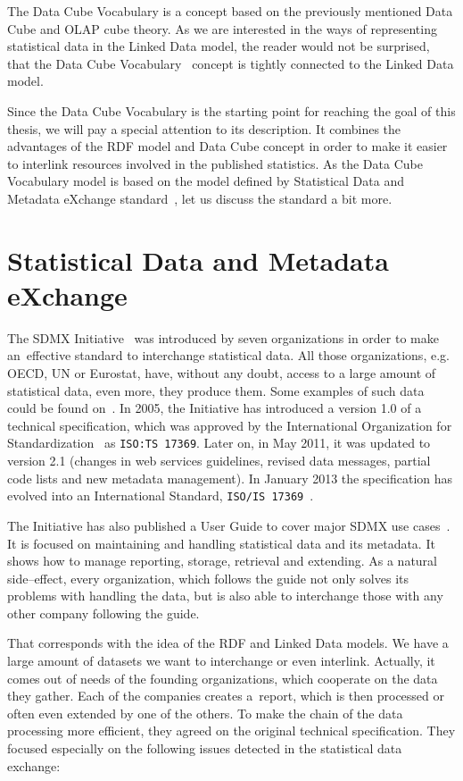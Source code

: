 The Data Cube Vocabulary is a concept based on the previously mentioned Data Cube and
OLAP cube theory. As we are interested in the ways of representing statistical data in the
Linked Data model, the reader would not be surprised, that the Data Cube 
Vocabulary~\cite{dcv}
concept is tightly connected to the Linked Data model.

Since the Data Cube Vocabulary is the starting point for reaching the goal of this thesis,
we will pay a special attention to its description. It combines the advantages of the RDF
model and Data Cube concept in order to make it easier to interlink resources involved
in the published statistics. As the Data Cube Vocabulary model is based on the model defined
by Statistical Data and Metadata eXchange standard~\cite{sdmx}, let us discuss the standard a bit more.

\section{Statistical Data and Metadata eXchange}
The SDMX Initiative~\cite{sdmx} was introduced by seven organizations in order to make
an~effective standard to interchange statistical data. All those organizations, e.g. OECD,
UN or Eurostat, have, without any doubt, access to a large amount of statistical data, even more,
they produce them. Some examples of such data could be found on~\cite{pubdata}.
In 2005, the Initiative has introduced a
version 1.0 of a technical specification, which was approved by the International
Organization for Standardization~\cite{iso} as \texttt{ISO:TS 17369}.
Later on, in May 2011, it was updated to version 2.1 (changes in web services guidelines,
revised data messages, partial code lists and new metadata management).
In January 2013 the specification has evolved into an International Standard,
\texttt{ISO/IS 17369}~\cite{isosdmx}.

The Initiative has also published a User Guide to cover major SDMX use cases~\cite{sdmxuserguide}.
It is focused on maintaining and handling statistical data and its metadata. It shows
how to manage reporting, storage, retrieval and extending. As a natural side--effect,
every organization, which follows the guide not only solves its problems with
handling the data, but is also able to interchange those with any other company
following the guide.

That corresponds with the idea of the RDF and Linked Data models. We have a large amount
of datasets we want to interchange or even interlink. Actually, it comes out of needs
of the founding organizations, which cooperate on the data they gather. Each of the companies creates
a~report, which is then processed or often even extended by one of the others. To make the chain
of the data processing more efficient, they agreed on the original technical specification.
They focused especially on the following issues detected in the statistical data exchange:


